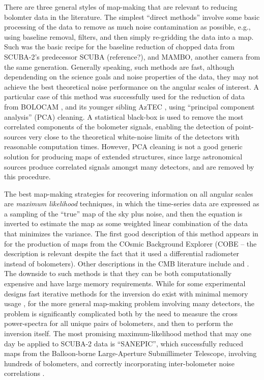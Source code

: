 \documentclass[useAMS,usenatbib,nofootinbib]{mn2e}
\begin{document}
There are three general styles of map-making that are relevant to
reducing bolomter data in the literature. The simplest ``direct
methods'' involve some basic processing of the data to remove as much
noise contamination as possible, e.g., using baseline removal,
filters, and then simply re-gridding the data into a map. Such was the
basic recipe for the baseline reduction of chopped data from SCUBA-2's
predecessor SCUBA (reference?), and MAMBO, another camera from the
same generation. Generally speaking, such methods are fast, although
dependending on the science goals and noise properties of the data,
they may not achieve the best theoretical noise performance on the
angular scales of interest. A particular case of this method was
successfully used for the reduction of data from BOLOCAM
\citep[e.g.][]{laurent2005}, and its younger sibling AzTEC
\citep[e.g.][]{scott2008}, using ``principal component analysis''
(PCA) cleaning. A statistical black-box is used to remove the most
correlated components of the bolometer signals, enabling the detection
of point-sources very close to the theoretical white-noise limits of
the detectors with reasonable computation times. However, PCA cleaning
is not a good generic solution for producing maps of extended
structures, since large astronomical sources produce correlated
signals amongst many detectors, and are removed by this procedure.

The best map-making strategies for recovering information on all
angular scales are \emph{maximum likelihood} techniques, in which the
time-series data are expressed as a sampling of the ``true'' map of
the sky plus noise, and then the equation is inverted to estimate the
map as some weighted linear combination of the data that minimizes the
variance.  The first good description of this method appears in
\citet{janssen1992} for the production of maps from the COsmic
Background Explorer (COBE -- the description is relevant despite the
fact that it used a differential radiometer instead of
bolometers). Other descriptions in the CMB literature include
\citet{tegmark1997} and \citet{stompor2002}.  The downside to such
methods is that they can be both computationally expensive and have
large memory requirements. While for some experimental designs fast
iterative methods for the inversion do exist with minimal memory usage
\citep[e.g.][]{wright1996}, for the more general map-making problem
involving many detectors, the problem is significantly complicated
both by the need to measure the cross power-spectra for all unique
pairs of bolometers, and then to perform the inversion itself. The
most promising maximum-likelihood method that may one day be applied
to SCUBA-2 data is ``SANEPIC'', which successfully reduced maps from
the Balloon-borne Large-Aperture Submillimeter Telescope, involving
hundreds of bolometers, and correctly incorporating inter-bolometer
noise correlations \citep[][]{patanchon2008}.
\end{document}
